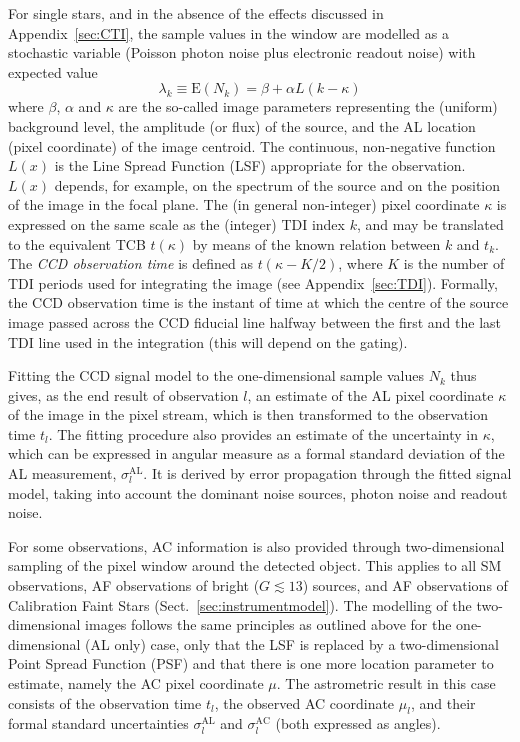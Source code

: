 \documentclass[structabstract]{aa}
\begin{document}
For single stars, and in the absence of the effects discussed in 
Appendix~\ref{sec:CTI}, the sample values in the window are modelled as a
stochastic variable (Poisson photon noise plus electronic readout noise) 
with expected value
\begin{equation}
    \lambda_k \equiv \mbox{E}\left( N_k \right) = \beta + \alpha L(k - \kappa)
    \label{eq:signal01}
\end{equation}
where $\beta$, $\alpha$ and $\kappa$ are the so-called image parameters
representing the (uniform) background level, the amplitude (or flux) of
the source, and the AL location (pixel coordinate) of the image centroid.
The continuous, non-negative function $L(x)$ is the Line Spread Function
(LSF) appropriate for the observation. $L(x)$  depends, for example, on the
spectrum of the source and on the position of the image in the focal plane.
The (in general non-integer) pixel coordinate $\kappa$ is expressed on
the same scale as the (integer) TDI index $k$, and may be translated to
the equivalent TCB $t(\kappa)$ by means of the known relation between
$k$ and $t_k$. The \emph{CCD observation time} is defined as
$t(\kappa - K/2)$, where $K$ is the number of TDI periods used for
integrating the image (see Appendix~\ref{sec:TDI}). Formally, the CCD observation 
time is the instant of time at which the centre of the source image
passed across the CCD fiducial line halfway between the first and the
last TDI line used in the integration (this will depend on the gating).

Fitting the CCD signal model to the one-dimensional sample values $N_k$
thus gives, as the end result of observation $l$, an estimate of the AL pixel
coordinate $\kappa$ of the image in the pixel stream, which is then transformed
to the observation time $t_l$. The fitting procedure also provides
an estimate of the uncertainty in $\kappa$, which can be expressed in
angular measure as a formal standard deviation of the AL measurement,
$\sigma_l^\text{AL}$. It is derived by error propagation through the
fitted signal model, taking into account the dominant noise sources,
photon noise and readout noise.

For some observations, AC information is also provided through
two-dimensional sampling of the pixel window around the detected object.
This applies to all SM observations, AF observations of bright
($G\lesssim 13$) sources, and AF observations of Calibration Faint Stars
(Sect.~\ref{sec:instrumentmodel}). The modelling of the two-dimensional
images follows the same principles as outlined above for the one-dimensional
(AL only) case, only that the LSF is replaced by a two-dimensional
Point Spread Function (PSF) and that there is one more location parameter
to estimate, namely the AC pixel coordinate $\mu$. The astrometric result
in this case consists of the observation time $t_l$, the
observed AC coordinate $\mu_l$, and their formal standard uncertainties
$\sigma_l^\text{AL}$ and $\sigma_l^\text{AC}$ (both expressed as angles).
\end{document}
